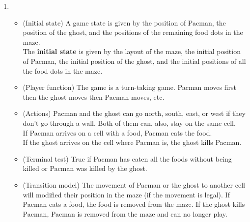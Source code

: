 \documentclass{article}
\begin{document}
\begin{enumerate}[label=\alph*.,leftmargin=*]
    \item
    	\begin{itemize}
    		\item (Initial state) A game state is given by the position of Pacman, the position of the ghost, and the positions of the remaining food dots in the maze.\\
    		The \textbf{initial state} is given by the layout of the maze, the initial position of Pacman, the initial position of the ghost, and the initial positions of all the food dots in the maze.
    		
    		\item (Player function) The game is a turn-taking game. Pacman moves first then the ghost moves then Pacman moves, etc.
    		
    		\item (Actions) Pacman and the ghost can go north, south, east, or west if they don't go through a wall. Both of them can, also, stay on the same cell.\\
    		If Pacman arrives on a cell with a food, Pacman eats the food.\\
    		If the ghost arrives on the cell where Pacman is, the ghost kills Pacman.
    		
    		\item (Terminal test) True if Pacman has eaten all the foods without being killed or Pacman was killed by the ghost.
    		
    		\item (Transition model) The movement of Pacman or the ghost to another cell will modified their position in the maze (if the movement is legal). If Pacman eats a food, the food is removed from the maze. If the ghost kills Pacman, Pacman is removed from the maze and can no longer play.
    		
			

\end{itemize}
\end{enumerate}
\end{document}
